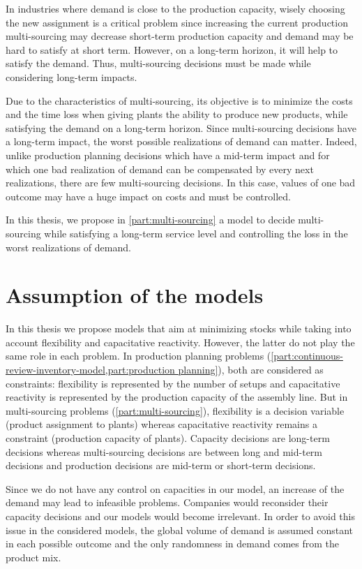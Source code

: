 In industries where demand is close to the production capacity, wisely choosing the new assignment is a critical problem since increasing the current production multi-sourcing may decrease short-term production capacity and demand may be hard to satisfy at short term.
However, on a long-term horizon, it will help to satisfy the demand.
Thus, multi-sourcing decisions must be made while considering long-term impacts.


Due to the characteristics of multi-sourcing, its objective is to minimize the costs and the time loss when giving plants the ability to produce new products, while satisfying the demand on a long-term horizon.
Since multi-sourcing decisions have a long-term impact, the worst possible realizations of demand can matter.
Indeed, unlike production planning decisions which have a mid-term impact and for which one bad realization of demand can be compensated by every next realizations, there are few multi-sourcing decisions.
In this case, values of one bad outcome may have a huge impact on costs and must be controlled.


\medskip


In this thesis, we propose in \cref{part:multi-sourcing} a model to decide multi-sourcing while satisfying a long-term service level and controlling the loss in the worst realizations of demand.


\section{Assumption of the models}


In this thesis we propose models that aim at minimizing stocks while taking into account flexibility and capacitative reactivity.
However, the latter do not play the same role in each problem.
In production planning problems (\cref{part:continuous-review-inventory-model,part:production planning}), both are considered as constraints: flexibility is represented by the number of setups and capacitative reactivity is represented by the production capacity of the assembly line.
But in multi-sourcing problems (\cref{part:multi-sourcing}), flexibility is a decision variable (product assignment to plants) whereas capacitative reactivity remains a constraint (production capacity of plants).
Capacity decisions are long-term decisions whereas multi-sourcing decisions are between long and mid-term decisions and production decisions are mid-term or short-term decisions.


Since we do not have any control on capacities in our model, an increase of the demand may lead to infeasible problems.
Companies would reconsider their capacity decisions and our models would become irrelevant.
In order to avoid this issue in the considered models, the global volume of demand is assumed constant in each possible outcome and the only randomness in demand comes from the product mix.


